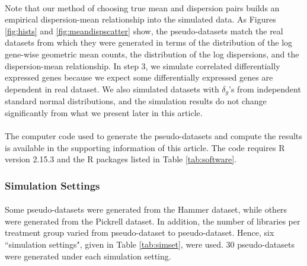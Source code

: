 \documentclass[10pt]{article}
\begin{document}
\paragraph{} \indent Note that our method of choosing true mean and dispersion pairs builds an empirical dispersion-mean relationship into the simulated data. As Figures \ref{fig:hists} and \ref{fig:meandispscatter} show, the pseudo-datasets match the real datasets from which they were generated in terms of the distribution of the log gene-wise geometric mean counts, the distribution of the log dispersions, and the dispersion-mean relationship. In step 3, we simulate correlated differentially expressed %
genes because we expect some differentially expressed %
genes are dependent in real dataset. We also simulated datasets with $\delta_g$'s from independent standard normal distributions, and the simulation results do not change significantly from what we present later in this article.

\paragraph{} \indent The computer code used to generate the pseudo-datasets and compute the results is available in the supporting information of this article. The code requires R version 2.15.3 and the R packages listed in Table \ref{tab:software}.


\subsubsection*{Simulation Settings}

\paragraph{} \indent Some pseudo-datasets were generated from the Hammer dataset, while others were generated from the Pickrell dataset. In addition, the number of libraries per treatment group varied from pseudo-dataset to pseudo-dataset. Hence, six ``simulation settings", given in Table \ref{tab:simset}, were used. 30 pseudo-datasets were generated under each simulation setting.
\end{document}
